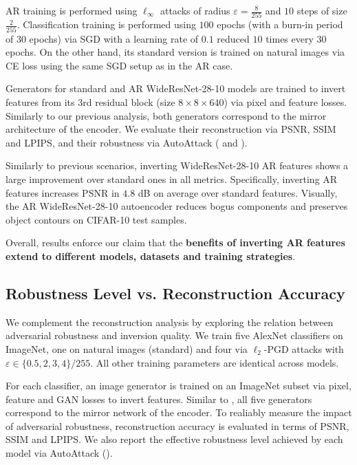 AR training is performed using $\ell_{\infty}$ attacks of radius $\varepsilon=\frac{8}{255}$ and $10$ steps of size $\frac{2}{255}$. Classification training is performed using $100$ epochs (with a burn-in period of $30$ epochs) via SGD with a learning rate of $0.1$ reduced $10$ times every $30$ epochs. On the other hand, its standard version is trained on natural images via CE loss using the same SGD setup as in the AR case.

Generators for standard and AR WideResNet-28-10 models are trained to invert features from its 3rd residual block (size $8\times 8 \times 640$) via pixel and feature losses. Similarly to our previous analysis, both generators correspond to the mirror architecture of the encoder. We evaluate their reconstruction via PSNR, SSIM and LPIPS, and their robustness via AutoAttack \cite{croce_2020_reliable} ( and ).

Similarly to previous scenarios, inverting WideResNet-28-10 AR features shows a large improvement over standard ones in all metrics. Specifically, inverting AR features increases PSNR in $4.8$ dB on average over standard features. Visually, the AR WideResNet-28-10 autoencoder reduces bogus components and preserves object contours on CIFAR-10 test samples.

Overall, results enforce our claim that the \textbf{benefits of inverting AR features extend to different models, datasets and training strategies}.


\subsection{Robustness Level vs. Reconstruction Accuracy}
\label{relationship_adversarial}
We complement the reconstruction analysis by exploring the relation between adversarial robustness and inversion quality. We train five AlexNet classifiers on ImageNet, one on natural images (standard) and four via $\ell_{2}$-PGD attacks with $\varepsilon\in \{0.5,2,3,4\}/255$. All other training parameters are identical across models.

For each classifier, an image generator is trained on an ImageNet subset via pixel, feature and GAN losses to invert  features. Similar to , all five generators correspond to the mirror network of the encoder. To realiably measure the impact of adversarial robustness, reconstruction accuracy is evaluated in terms of PSNR, SSIM and LPIPS. We also report the effective robustness level achieved by each model via AutoAttack ().



